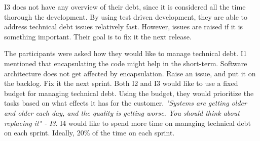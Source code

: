 I3 does not have any overview of their debt, since it is considered all the time thorough the development. By using test driven development, they are able to address technical debt issues relatively fast. However, issues are raised if it is something important. Their goal is to fix it the next release.  


The participants were asked how they would like to manage technical debt. I1 mentioned that encapsulating the code might help in the short-term. Software architecture does not get affected by encapsulation. Raise an issue, and put it on the backlog. Fix it the next sprint. Both I2 and I3 would like to use a fixed budget for managing technical debt. Using the budget, they would prioritize the tasks based on what effects it has for the customer. \textit{"Systems are getting older and older each day, and the quality is getting worse. You should think about replacing it" - I3}. I4 would like to spend more time on managing technical debt on each sprint. Ideally, 20\% of the time on each sprint.


